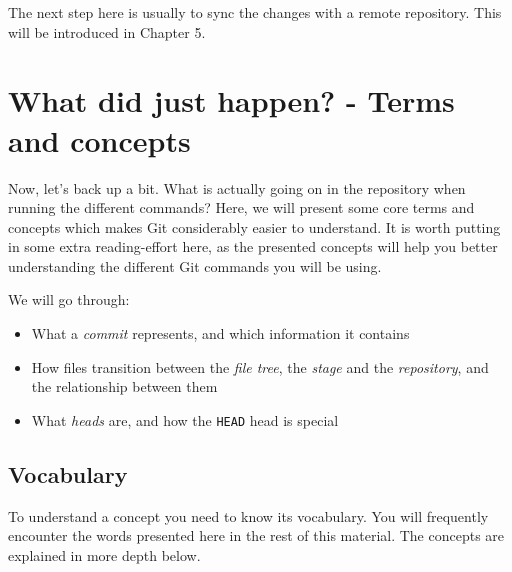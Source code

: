 \documentclass[../main/git_course_main.tex]{subfiles}
\begin{document}
The next step here is usually to sync the changes with a remote repository.
This will be introduced in Chapter 5.

\section{What did just happen? - Terms and concepts}

Now, let's back up a bit. What is actually going on in the repository when running the different commands? Here, we will present some core terms and concepts which makes Git considerably easier to understand. It is worth putting in some extra reading-effort here, as the presented concepts will help you better understanding the different Git commands you will be using.

We will go through:

\begin{itemize}
	\item What a \textit{commit} represents, and which information it contains
	\item How files transition between the \textit{file tree}, the \textit{stage} and the \textit{repository}, and the relationship between them
	\item What \textit{heads} are, and how the \verb$HEAD$ head is special
\end{itemize}

\subsection{Vocabulary}

To understand a concept you need to know its vocabulary. You will frequently encounter the words presented here in the rest of this material. The concepts are explained in more depth below.
\end{document}
